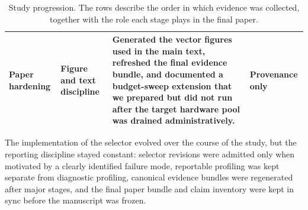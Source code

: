 \begin{table}[t]
\begin{tabular}{p{}p{}p{}p{}}
Paper hardening & Figure and text discipline & Generated the vector figures used in the main text, refreshed the final evidence bundle, and documented a budget-sweep extension that we prepared but did not run after the target hardware pool was drained administratively. & Provenance only \\
\bottomrule
\end{tabular}
\caption{Study progression. The rows describe the order in which evidence was collected, together with the role each stage plays in the final paper.}
\label{tab:rounds}
\end{table}

The implementation of the selector evolved over the course of the study, but the reporting discipline stayed constant: selector revisions were admitted only when motivated by a clearly identified failure mode, reportable profiling was kept separate from diagnostic profiling, canonical evidence bundles were regenerated after major stages, and the final paper bundle and claim inventory were kept in sync before the manuscript was frozen.

